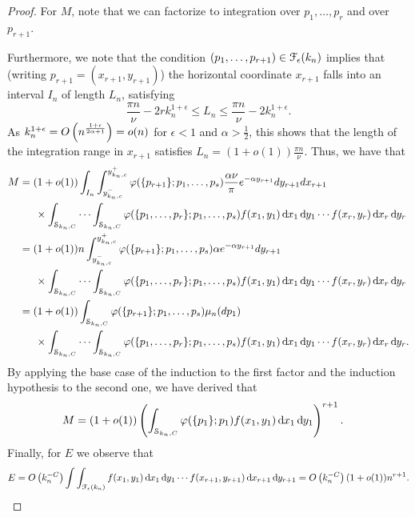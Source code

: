 \begin{proof}
For $M$, note that we can factorize to integration over $p_1,\dots,p_r$ and over $p_{r+1}$.

Furthermore, we note that the condition $(p_1,\dots,p_{r+1})\in \mathcal{F}_\epsilon(k_n)$ implies that (writing $p_{r+1}=(x_{r+1},y_{r+1})$) the horizontal coordinate $x_{r+1}$ falls into an interval $I_n$ of length $L_n$, satisfying
\[
	\frac{\pi n}{\nu}-2rk_n^{1+\epsilon}\leq L_n\leq \frac{\pi n}{\nu}-2k_n^{1+\epsilon}.
\]
As $k_n^{1+\epsilon} = O\left(n^{\frac{1+\epsilon}{2\alpha+1}}\right) = o(n)$ for $\epsilon<1$ and $\alpha>\frac{1}{2}$, this shows that the length of the integration range in $x_{r+1}$ satisfies $L_n=(1+o(1))\frac{\pi n}{\nu}$. Thus, we have that
\begin{align*}
	M &= (1+o(1))\int_{I_n}\int_{y_{k_n,c}^-}^{y_{k_n,c}^+} \varphi(\{p_{r+1}\};p_1,\dots,p_s)
		\frac{\alpha\nu}{\pi} e^{-\alpha y_{r+1}}dy_{r+1}dx_{r+1}\\
	&\hspace{15pt} \times \int_{\stripknc} \cdots \int_{\stripknc} 
		\varphi(\{p_1,\dots,p_r\};p_1,\dots,p_s)f(x_1,y_1) \dd x_1 \dd y_1 \cdots f(x_{r},y_{r})\dd x_{r} \dd y_{r}\\
	&=(1+o(1))n\int_{y_{k_n,c}^-}^{y_{k_n,c}^+} \varphi(\{p_{r+1}\};p_1,\dots,p_s)\alpha e^{-\alpha y_{r+1}}dy_{r+1}\\
	&\hspace{15pt} \times \int_{\stripknc} \cdots \int_{\stripknc} \varphi(\{p_1,\dots,p_r\};p_1,\dots,p_s)
		f(x_1,y_1) \dd x_1 \dd y_1 \cdots f(x_{r},y_{r})\dd x_{r} \dd y_{r}\\
	&=(1+o(1))\int_{\stripknc} \varphi(\{p_{r+1}\};p_1,\dots,p_s)\mu_n(dp_1)\\
	&\hspace{15pt} \times\int_{\stripknc} \cdots \int_{\stripknc} \varphi(\{p_1,\dots,p_r\};p_1,\dots,p_s)
		f(x_1,y_1) \dd x_1 \dd y_1 \cdots f(x_{r},y_{r})\dd x_{r} \dd y_{r}.
\end{align*}
By applying the base case of the induction to the first factor and the induction hypothesis to the second one, we have derived that
\begin{align*}
M&=(1+o(1))\left(\int_{\mathcal{S}_{k_n,C}} \varphi(\{p_1\};p_1) f(x_1,y_1) \operatorname{\mathrm{d}\hspace{-2pt}} x_1 \operatorname{\mathrm{d}\hspace{-2pt}} y_1 \right)^{r+1}.
\end{align*}
Finally, for $E$ we observe that
\begin{align*}
	E=O\left(k_n^{-C}\right)\int \int_{\mathcal{F}_\epsilon(k_n)} 
	f(x_1,y_1) \operatorname{\mathrm{d}\hspace{-2pt}} x_1 \operatorname{\mathrm{d}\hspace{-2pt}} y_1 \cdots f(x_{r+1},y_{r+1})\operatorname{\mathrm{d}\hspace{-2pt}} x_{r+1} \operatorname{\mathrm{d}\hspace{-2pt}} y_{r+1} 
	= O\left(k_n^{-C}\right)(1+o(1))n^{r+1}.
\end{align*}

\end{proof}

